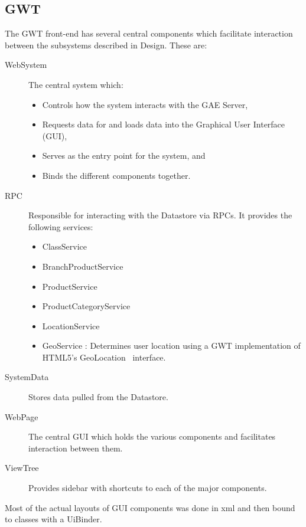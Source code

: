 \subsection{GWT}
The GWT front-end has several central components which facilitate interaction between the subsystems described in Design.
These are:
\begin{description}
\item[WebSystem] The central system which:
\begin{itemize}
\item Controls how the system interacts with the GAE Server,
\item Requests data for and loads data into the Graphical User Interface (GUI),
\item Serves as the entry point for the system, and
\item Binds the different components together.
\end{itemize}  
\item[RPC] Responsible for interacting with the Datastore via RPCs. It provides the following services:  
\begin{itemize}
\item ClassService
\item BranchProductService
\item ProductService
\item ProductCategoryService
\item LocationService
\item GeoService : Determines user location using a GWT implementation of HTML5's GeoLocation~\cite{geo} interface.
\end{itemize}
 \item[SystemData] Stores data pulled from the Datastore.
 \item[WebPage] The central GUI which holds the various components and
 facilitates interaction between them.
  \item[ViewTree] Provides sidebar with shortcuts to each of the major components. 
\end{description}
Most of the actual layouts of GUI components was done in xml and then bound to
classes with a UiBinder.





